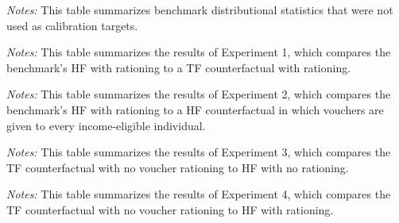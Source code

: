 \documentclass[parskip=full]{article}
\theoremstyle{plain}
\theoremstyle{definition}
\theoremstyle{remark}
\newenvironment{fignote2}[1]
{
\par
\medskip
\begin{minipage}{#1}
\footnotesize
}
{
\end{minipage}
}
\begin{document}
\begin{table}[H]
    \centering
    \vspace{-0.5cm}
    
    \vspace{-0.5cm}
    \begin{fignote2}{0.66\textwidth}
    \textit{Notes:} 
    This table summarizes benchmark distributional statistics that were not used as calibration targets.
    \end{fignote2}
\end{table}

\begin{table}[H]
    \centering
    \vspace{-0.5cm}
    
    \vspace{-0.5cm}
    \begin{fignote2}{0.71\textwidth}
    \textit{Notes:} 
    This table summarizes the results of Experiment 1, which compares the benchmark's HF with rationing to a TF counterfactual with rationing.
    \end{fignote2}
\end{table}

\begin{table}[H]
    \centering
    \vspace{-0.5cm}
    
    \vspace{-0.5cm}
    \begin{fignote2}{0.71\textwidth}
    \textit{Notes:} 
    This table summarizes the results of Experiment 2, which compares the benchmark's HF with rationing to a HF counterfactual in which vouchers are given to every income-eligible individual.
    \end{fignote2}
\end{table}

\begin{table}[H]
    \centering
    \vspace{-0.5cm}
    
    \vspace{-0.5cm}
    \begin{fignote2}{0.69\textwidth}
    \textit{Notes:} 
    This table summarizes the results of Experiment 3, which compares the TF counterfactual with no voucher rationing to HF with no rationing. 
    \end{fignote2}
\end{table}

\begin{table}[H]
    \centering
    \vspace{-0.5cm}
    
    \vspace{-0.5cm}
    \begin{fignote2}{0.68\textwidth}
    \textit{Notes:} 
    This table summarizes the results of Experiment 4, which compares the TF counterfactual with no voucher rationing to HF with rationing. 
    \end{fignote2}
\end{table}
\end{document}
